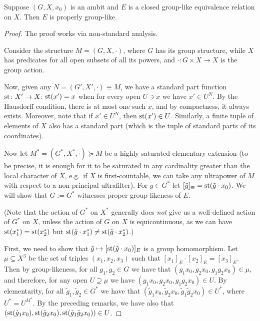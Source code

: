 	\begin{prop}
		\label{prop:closed_glike_is_properly_glike}
		Suppose $(G,X,x_0)$ is an ambit and $E$ is a closed group-like equivalence relation on $X$. Then $E$ is properly group-like.
	\end{prop}
	\begin{proof}
		The proof works via non-standard analysis.
		
		Consider the structure $M=(G,X,\cdot)$, where $G$ has its group structure, while $X$ has predicates for all open subsets of all its powers, and $\cdot\colon G\times X\to X$ is the group action.
		
		Now, given any $N=(G',X',\cdot )\equiv M$, we have a standard part function ${\operatorname{{st}}}\colon X'\to X$: $\operatorname{{st}}(x')=x$ when for every open $U\ni x$ we have $x'\in U^N$. By the Hausdorff condition, there is at most one such $x$, and by compactness, it always exists. Moreover, note that if $x'\in U^N$, then $\operatorname{{st}}(x')\in U$. Similarly, a finite tuple of elements of $X$ also has a standard part (which is the tuple of standard parts of its coordinates).
		
		Now let $M^*=(G^*,X^*,\cdot)\succeq M$ be a highly saturated elementary extension (to be precise, it is enough for it to be saturated in any cardinality greater than the local character of $X$, e.g.\ if $X$ is first-countable, we can take any ultrapower of $M$ with respect to a non-principal ultrafilter). For $\tilde g\in G^*$ let $[\tilde g]_\equiv=\operatorname{{st}}(\tilde g\cdot x_0)$. We will show that $\tilde G:=G^*$ witnesses proper group-likeness of $E$.
		
		(Note that the action of $G^*$ on $X^*$ generally does \emph{not} give us a well-defined action of $G^*$ on $X$, unless the action of $G$ on $X$ is equicontinuous, as we can have $\operatorname{{st}}(x_1^*)=\operatorname{{st}}(x_2^*)$ but $\operatorname{{st}}(\tilde g\cdot x_1^*)\neq \operatorname{{st}}(\tilde g\cdot x_2^*)$.)
		
		First, we need to show that $\tilde g\mapsto [\operatorname{{st}}(\tilde g\cdot x_0)]_E$ is a group homomorphism. Let $\mu\subseteq X^3$ be the set of triples $(x_1,x_2,x_3)$ such that $[x_1]_E\cdot [x_2]_E=[x_3]_E$. Then by group-likeness, for all $g_1,g_2\in G$ we have that $(g_1x_0,g_2x_0,g_1g_2x_0)\in \mu$, and therefore, for any open $U\supseteq \mu$ we have $(g_1x_0,g_2x_0,g_1g_2x_0)\in U$. By elementarity, for all $\tilde g_1,\tilde g_2\in G^*$ we have that $(\tilde g_1x_0,\tilde g_2x_0,\tilde g_1\tilde g_2 x_0)\in U^*$, where $U^*=U^{M^*}$. By the preceding remarks, we have also that $(\operatorname{{st}}(\tilde g_1x_0),\operatorname{{st}}(\tilde g_2x_0),\operatorname{{st}}(\tilde g_1\tilde g_2x_0))\in U$.
		

\end{proof}
